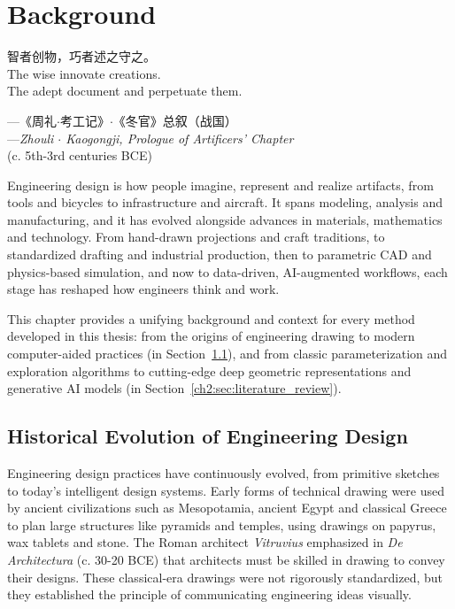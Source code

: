 \chapter{Background}
\label{ch2}

\setlength{\epigraphwidth}{0.55\textwidth} 
\begin{CJK*}{UTF8}{gbsn}
    \epigraph{
        智者创物，巧者述之守之。\\
        The wise innovate creations.\\
        The adept document and perpetuate them.
    }{
        ---《周礼$\cdot$考工记》$\cdot$《冬官》总叙（战国）\\
        ---\textit{Zhouli $\cdot$ Kaogongji,  Prologue of Artificers' Chapter} \\
        (c. 5th-3rd centuries BCE)
    } 
\end{CJK*}


Engineering design is how people imagine, represent and realize artifacts, from tools and bicycles to infrastructure and aircraft. It spans modeling, analysis and manufacturing, and it has evolved alongside advances in materials, mathematics and technology. From hand-drawn projections and craft traditions, to standardized drafting and industrial production, then to parametric CAD and physics-based simulation, and now to data-driven, AI-augmented workflows, each stage has reshaped how engineers think and work. 

This chapter provides a unifying background and context for every method developed in this thesis: from the origins of engineering drawing to modern computer-aided practices (in Section~\ref{ch2:sec:history}), and from classic parameterization and exploration algorithms to cutting-edge deep geometric representations and generative AI models (in Section~\ref{ch2:sec:literature_review}).

\section{Historical Evolution of Engineering Design}
\label{ch2:sec:history}

Engineering design practices have continuously evolved, from primitive sketches to today’s intelligent design systems. Early forms of technical drawing were used by ancient civilizations such as Mesopotamia, ancient Egypt and classical Greece to plan large structures like pyramids and temples, using drawings on papyrus, wax tablets and stone. The Roman architect \textit{Vitruvius} emphasized in \textit{De Architectura} (c. 30-20 BCE) that architects must be skilled in drawing to convey their designs. These classical-era drawings were not rigorously standardized, but they established the principle of communicating engineering ideas visually.

